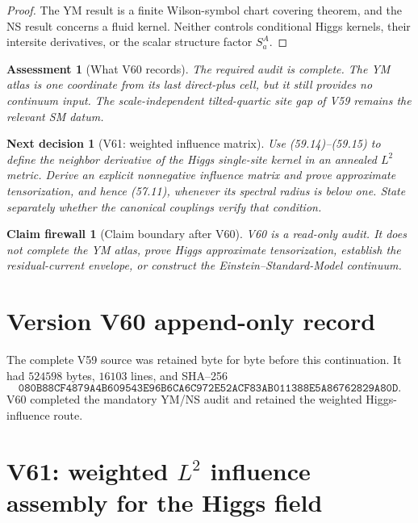 \documentclass[11pt]{article}
\newtheorem{firewall}[theorem]{Claim firewall}
\newtheorem{decision}[theorem]{Next decision}
\newtheorem{assessment}[theorem]{Assessment}
\theoremstyle{remark}
\begin{document}
\begin{proof}
The YM result is a finite Wilson-symbol chart covering theorem, and
the NS result concerns a fluid kernel.  Neither controls conditional
Higgs kernels, their intersite derivatives, or the scalar structure
factor \(S_a^A\).
\end{proof}

\begin{assessment}[What V60 records]
\label{ass:v17v60-status}
The required audit is complete.  The YM atlas is one coordinate from
its last direct-plus cell, but it still provides no continuum input.
The scale-independent tilted-quartic site gap of V59 remains the
relevant SM datum.
\end{assessment}

\begin{decision}[V61: weighted influence matrix]
\label{dec:v17v60-next}
Use (59.14)--(59.15) to define the neighbor derivative of the Higgs
single-site kernel in an annealed \(L^2\) metric.  Derive an explicit
nonnegative influence matrix and prove approximate tensorization, and
hence (57.11), whenever its spectral radius is below one.  State
separately whether the canonical couplings verify that condition.
\end{decision}

\begin{firewall}[Claim boundary after V60]
\label{fire:v17v60}
V60 is a read-only audit.  It does not complete the YM atlas, prove
Higgs approximate tensorization, establish the residual-current
envelope, or construct the Einstein--Standard-Model continuum.
\end{firewall}

\section*{Version V60 append-only record}
The complete V59 source was retained byte for byte before this
continuation.  It had \(524598\) bytes, \(16103\) lines, and SHA--256
\[
 \texttt{080B88CF4879A4B609543E96B6CA6C972E52ACF83AB011388E5A86762829A80D}.
\]
V60 completed the mandatory YM/NS audit and retained the weighted
Higgs-influence route.


\section{V61: weighted \(L^2\) influence assembly for the Higgs field}
\label{sec:v17v61}
\end{document}
